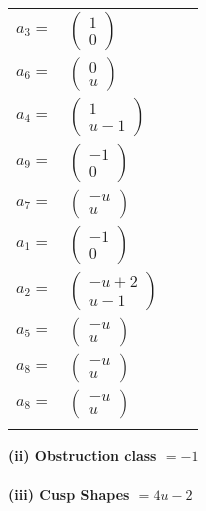 \documentclass[1p]{elsarticle_modified}
\theoremstyle{definition}
\begin{document}
\begin{tabular}{m{7pt} m{180pt} m{7pt} m{180pt} }
\flushright $a_{3}=$&$\begin{pmatrix}1\\0\end{pmatrix}$ \\
\flushright $a_{6}=$&$\begin{pmatrix}0\\u\end{pmatrix}$ \\
\flushright $a_{4}=$&$\begin{pmatrix}1\\u-1\end{pmatrix}$ \\
\flushright $a_{9}=$&$\begin{pmatrix}-1\\0\end{pmatrix}$ \\
\flushright $a_{7}=$&$\begin{pmatrix}- u\\u\end{pmatrix}$ \\
\flushright $a_{1}=$&$\begin{pmatrix}-1\\0\end{pmatrix}$ \\
\flushright $a_{2}=$&$\begin{pmatrix}- u+2\\u-1\end{pmatrix}$ \\
\flushright $a_{5}=$&$\begin{pmatrix}- u\\u\end{pmatrix}$ \\
\flushright $a_{8}=$&$\begin{pmatrix}- u\\u\end{pmatrix}$\\ \flushright $a_{8}=$&$\begin{pmatrix}- u\\u\end{pmatrix}$\\&\end{tabular}
\flushleft \textbf{(ii) Obstruction class $= -1$}\\~\\
\flushleft \textbf{(iii) Cusp Shapes $= 4 u-2$}\\~\\
\end{document}
